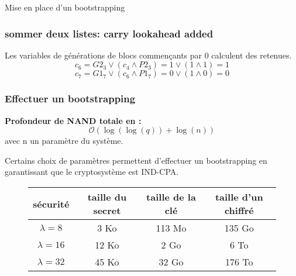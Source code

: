 \documentclass[10pt,xcolor={usenames,dvipsnames}]{beamer}
\begin{document}
\begin{section}{Mise en place d'un bootstrapping}
\begin{frame} 
\frametitle{sommer deux listes: carry lookahead added}
  \begin{figure}
    \begin{center}
      \begin{tikzpicture}[scale = 0.7, transform shape]
      	
      \end{tikzpicture}
    \end{center}
  \end{figure}
Les variables de générations de blocs commençants par 0 calculent des retenues.
\[c_6 = G2_3 \vee \left( c_4 \wedge P2_3\right) = 1 \vee \left( 1 \wedge 1 \right) = 1 \]
\[c_7 = G1_7 \vee \left( c_6 \wedge P1_7\right) = 0 \vee \left( 1 \wedge 0 \right) = 0 \]
\end{frame} 


\begin{frame} 
\frametitle{Effectuer un bootstrapping}

\textbf{Profondeur de NAND totale en :} 
$$\mathcal{O}(\log(\log(q)) + \log(n))$$
avec n un paramètre du système.

Certains choix de paramètres permettent d'effectuer un bootstrapping en garantissant que le cryptosystème est IND-CPA.
\pause

\begin{figure}
\begin{tabular}{|c|c|c|c|}
\hline
sécurité & taille du secret & taille de la clé & taille d'un chiffré \\
\hline
$\lambda = 8$ & 3 Ko & 113 Mo & 135 Go \\
\hline
$\lambda = 16$ & 12 Ko & 2 Go & 6 To \\
\hline
$\lambda = 32$ & 45 Ko & 32 Go & 176 To \\
\hline
\end{tabular}
\end{figure}
\end{frame}

\end{section}
\end{document}
